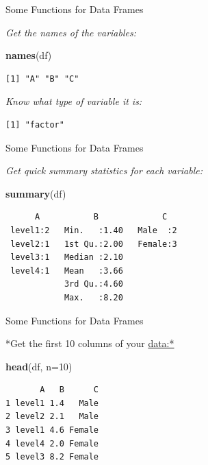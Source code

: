 \documentclass[ignorenonframetext,]{beamer}
\newenvironment{Shaded}{\begin{snugshade}}{\end{snugshade}}
\newcommand{\KeywordTok}[1]{\textcolor[rgb]{0.13,0.29,0.53}{\textbf{{#1}}}}
\newcommand{\DataTypeTok}[1]{\textcolor[rgb]{0.13,0.29,0.53}{{#1}}}
\newcommand{\DecValTok}[1]{\textcolor[rgb]{0.00,0.00,0.81}{{#1}}}
\newcommand{\NormalTok}[1]{{#1}}
\begin{document}
\begin{frame}[fragile]{Some Functions for Data Frames}

\emph{Get the names of the variables:}

\begin{Shaded}
\begin{Highlighting}[]
\KeywordTok{names}\NormalTok{(df)}
\end{Highlighting}
\end{Shaded}

\begin{verbatim}
[1] "A" "B" "C"
\end{verbatim}

\emph{Know what type of variable it is:}

\begin{Shaded}
\end{Shaded}

\begin{verbatim}
[1] "factor"
\end{verbatim}

\end{frame}

\begin{frame}[fragile]{Some Functions for Data Frames}

\emph{Get quick summary statistics for each variable:}

\begin{Shaded}
\begin{Highlighting}[]
\KeywordTok{summary}\NormalTok{(df)}
\end{Highlighting}
\end{Shaded}

\begin{verbatim}
      A           B             C    
 level1:2   Min.   :1.40   Male  :2  
 level2:1   1st Qu.:2.00   Female:3  
 level3:1   Median :2.10             
 level4:1   Mean   :3.66             
            3rd Qu.:4.60             
            Max.   :8.20             
\end{verbatim}

\end{frame}

\begin{frame}[fragile]{Some Functions for Data Frames}

*Get the first 10 columns of your \url{data:*}

\begin{Shaded}
\begin{Highlighting}[]
\KeywordTok{head}\NormalTok{(df, }\DataTypeTok{n=}\DecValTok{10}\NormalTok{)}
\end{Highlighting}
\end{Shaded}

\begin{verbatim}
       A   B      C
1 level1 1.4   Male
2 level2 2.1   Male
3 level1 4.6 Female
4 level4 2.0 Female
5 level3 8.2 Female
\end{verbatim}

\end{frame}
\end{document}
